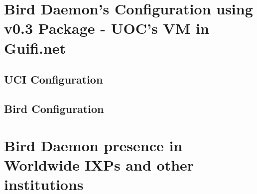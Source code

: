 \newpage
\begin{appendices}
\appendixpage
\noappendicestocpagenum
\addappheadtotoc
{}

\chapter{Bird Daemon's Configuration using v0.3 Package - UOC's VM in Guifi.net}
\label{app:ch:bdcuoc}

\section{UCI Configuration}


\section{Bird Configuration}



\chapter{Bird Daemon presence in Worldwide IXPs and other institutions}
\label{app:ch:blinks}

\end{appendices}